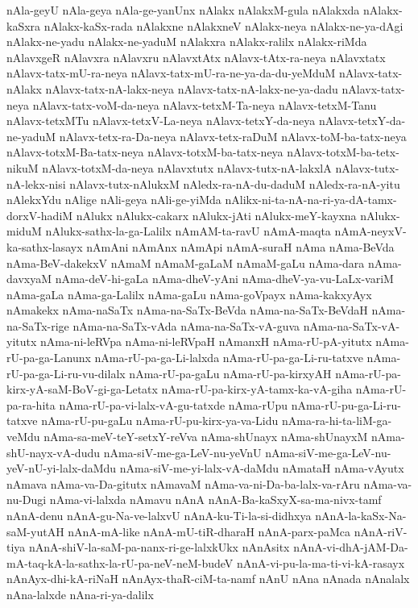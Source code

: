 {nAla-geyU
nAla-geya
nAla-ge-yanUnx
nAlakx
nAlakxM-gula
nAlakxda
nAlakx-kaSxra
nAlakx-kaSx-rada
nAlakxne
nAlakxneV
nAlakx-neya
nAlakx-ne-ya-dAgi
nAlakx-ne-yadu
nAlakx-ne-yaduM
nAlakxra
nAlakx-ralilx
nAlakx-riMda
nAlavxgeR
nAlavxra
nAlavxru
nAlavxtAtx
nAlavx-tAtx-ra-neya
nAlavxtatx
nAlavx-tatx-mU-ra-neya
nAlavx-tatx-mU-ra-ne-ya-da-du-yeMduM
nAlavx-tatx-nAlakx
nAlavx-tatx-nA-lakx-neya
nAlavx-tatx-nA-lakx-ne-ya-dadu
nAlavx-tatx-neya
nAlavx-tatx-voM-da-neya
nAlavx-tetxM-Ta-neya
nAlavx-tetxM-Tanu
nAlavx-tetxMTu
nAlavx-tetxV-La-neya
nAlavx-tetxY-da-neya
nAlavx-tetxY-da-ne-yaduM
nAlavx-tetx-ra-Da-neya
nAlavx-tetx-raDuM
nAlavx-toM-ba-tatx-neya
nAlavx-totxM-Ba-tatx-neya
nAlavx-totxM-ba-tatx-neya
nAlavx-totxM-ba-tetx-nikuM
nAlavx-totxM-da-neya
nAlavxtutx
nAlavx-tutx-nA-lakxlA
nAlavx-tutx-nA-lekx-nisi
nAlavx-tutx-nAlukxM
nAledx-ra-nA-du-daduM
nAledx-ra-nA-yitu
nAlekxYdu
nAlige
nAli-geya
nAli-ge-yiMda
nAlikx-ni-ta-nA-na-ri-ya-dA-tamx-dorxV-hadiM
nAlukx
nAlukx-cakarx
nAlukx-jAti
nAlukx-meY-kayxna
nAlukx-miduM
nAlukx-sathx-la-ga-Lalilx
nAmAM-ta-ravU
nAmA-maqta
nAmA-neyxV-ka-sathx-lasayx
nAmAni
nAmAnx
nAmApi
nAmA-suraH
nAma
nAma-BeVda
nAma-BeV-dakekxV
nAmaM
nAmaM-gaLaM
nAmaM-gaLu
nAma-dara
nAma-davxyaM
nAma-deV-hi-gaLa
nAma-dheV-yAni
nAma-dheV-ya-vu-LaLx-variM
nAma-gaLa
nAma-ga-Lalilx
nAma-gaLu
nAma-goVpayx
nAma-kakxyAyx
nAmakekx
nAma-naSaTx
nAma-na-SaTx-BeVda
nAma-na-SaTx-BeVdaH
nAma-na-SaTx-rige
nAma-na-SaTx-vAda
nAma-na-SaTx-vA-guva
nAma-na-SaTx-vA-yitutx
nAma-ni-leRVpa
nAma-ni-leRVpaH
nAmanxH
nAma-rU-pA-yitutx
nAma-rU-pa-ga-Lanunx
nAma-rU-pa-ga-Li-lalxda
nAma-rU-pa-ga-Li-ru-tatxve
nAma-rU-pa-ga-Li-ru-vu-dilalx
nAma-rU-pa-gaLu
nAma-rU-pa-kirxyAH
nAma-rU-pa-kirx-yA-saM-BoV-gi-ga-Letatx
nAma-rU-pa-kirx-yA-tamx-ka-vA-giha
nAma-rU-pa-ra-hita
nAma-rU-pa-vi-lalx-vA-gu-tatxde
nAma-rUpu
nAma-rU-pu-ga-Li-ru-tatxve
nAma-rU-pu-gaLu
nAma-rU-pu-kirx-ya-va-Lidu
nAma-ra-hi-ta-liM-ga-veMdu
nAma-sa-meV-teY-setxY-reVva
nAma-shUnayx
nAma-shUnayxM
nAma-shU-nayx-vA-dudu
nAma-siV-me-ga-LeV-nu-yeVnU
nAma-siV-me-ga-LeV-nu-yeV-nU-yi-lalx-daMdu
nAma-siV-me-yi-lalx-vA-daMdu
nAmataH
nAma-vAyutx
nAmava
nAma-va-Da-gitutx
nAmavaM
nAma-va-ni-Da-ba-lalx-va-rAru
nAma-va-nu-Dugi
nAma-vi-lalxda
nAmavu
nAnA
nAnA-Ba-kaSxyX-sa-ma-nivx-tamf
nAnA-denu
nAnA-gu-Na-ve-lalxvU
nAnA-ku-Ti-la-si-didhxya
nAnA-la-kaSx-Na-saM-yutAH
nAnA-mA-like
nAnA-mU-tiR-dharaH
nAnA-parx-paMca
nAnA-riV-tiya
nAnA-shiV-la-saM-pa-nanx-ri-ge-lalxkUkx
nAnAsitx
nAnA-vi-dhA-jAM-Da-mA-taq-kA-la-sathx-la-rU-pa-neV-neM-budeV
nAnA-vi-pu-la-ma-ti-vi-kA-rasayx
nAnAyx-dhi-kA-riNaH
nAnAyx-thaR-ciM-ta-namf
nAnU
nAna
nAnada
nAnalalx
nAna-lalxde
nAna-ri-ya-dalilx
}
